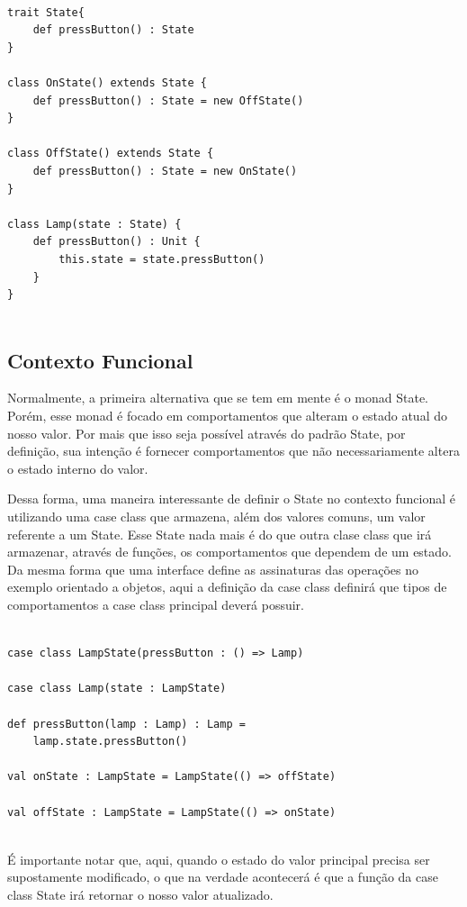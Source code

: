 \begin{lstlisting}[caption={State Orientação a Objetos},label=oostate]

trait State{
    def pressButton() : State
}

class OnState() extends State {
    def pressButton() : State = new OffState()
}

class OffState() extends State {
    def pressButton() : State = new OnState()
}

class Lamp(state : State) {
    def pressButton() : Unit {
        this.state = state.pressButton()
    }
}
    
\end{lstlisting}

\subsection*{Contexto Funcional}

Normalmente, a primeira alternativa que se tem em mente é 
o monad State. Porém, esse monad é focado em comportamentos 
que alteram o estado atual do nosso valor. Por mais que isso 
seja possível através do padrão State, por definição, sua 
intenção é fornecer comportamentos que não necessariamente 
altera o estado interno do valor.

Dessa forma, uma maneira interessante de definir o State 
no contexto funcional é utilizando uma case class que armazena, 
além dos valores comuns, um valor referente a um State. 
Esse State nada mais é do que outra clase class que 
irá armazenar, através de funções, os comportamentos que 
dependem de um estado. Da mesma forma que uma interface 
define as assinaturas das operações no exemplo orientado a 
objetos, aqui a definição da case class definirá que tipos 
de comportamentos a case class principal deverá possuir.

\begin{lstlisting}[caption={State Funcional},label=fpstate]
    
case class LampState(pressButton : () => Lamp)

case class Lamp(state : LampState)

def pressButton(lamp : Lamp) : Lamp =
    lamp.state.pressButton()

val onState : LampState = LampState(() => offState)

val offState : LampState = LampState(() => onState)
    
\end{lstlisting}

É importante notar que, aqui, quando o estado do valor 
principal precisa ser supostamente modificado, o que na 
verdade acontecerá é que a função da case class State 
irá retornar o nosso valor atualizado.